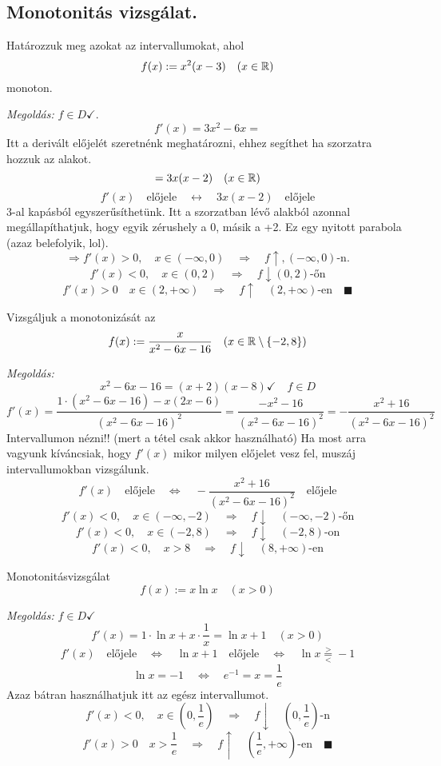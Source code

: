 \documentclass[a4paper,11.5pt]{article}
\begin{document}
	\subsection{Monotonitás vizsgálat.}
	\begin{task}Határozzuk meg azokat az intervallumokat, ahol
		 \[f(x):=x^2(x-3)\quad (x\in\mathbb{R})\]
		monoton.
		
		\textit{Megoldás:} $f\in D\checkmark$.
		\[ f'(x)=3x^2-6x= \]
		Itt a derivált előjelét szeretnénk meghatározni, ehhez segíthet ha szorzatra hozzuk az alakot.
		\[ =3x(x-2)\quad (x\in\mathbb{R}) \]
		\[ f'(x)\quad \text{előjele}\quad \leftrightarrow\quad 3x(x-2)\quad \text{előjele} \]
		3-al kapásból egyszerűsíthetünk. Itt a szorzatban lévő alakból azonnal megállapíthatjuk, hogy egyik zérushely a 0, másik a +2. Ez egy nyitott parabola (azaz belefolyik, lol).
		\[ \Rightarrow f'(x)>0,\quad x\in(-\infty,0)\quad \Rightarrow\quad f\uparrow, (-\infty, 0)\text{-n.} \]
		\[ f'(x)<0,\quad x\in(0,2)\quad \Rightarrow\quad f\downarrow (0,2)\text{-őn} \]
		\[ f'(x)>0\quad x\in (2,+\infty)\quad \Rightarrow\quad f\uparrow\quad (2,+\infty)\text{-en}\quad \blacksquare \]
	\end{task}
	\begin{task}
		Vizsgáljuk a monotonizását az
		\[ f(x):=\frac{x}{x^2-6x-16}\quad (x\in\mathbb{R}\setminus\{-2,8\}) \]
		
		\textit{Megoldás:}\[ x^2-6x-16=(x+2)(x-8)\checkmark\quad f\in D \]
		\[ f'(x)=\frac{1\cdot(x^2-6x-16)-x(2x-6)}{(x^2-6x-16)^2}=\frac{-x^2-16}{(x^2-6x-16)^2}=-\frac{x^2+16}{(x^2-6x-16)^2} \]
		Intervallumon nézni!! (mert a tétel csak akkor használható) Ha most arra vagyunk kíváncsiak, hogy $f'(x)$ mikor milyen előjelet vesz fel, muszáj intervallumokban vizsgálunk.
		\[ f'(x) \quad \text{előjele}\quad \Leftrightarrow\quad -\frac{x^2+16}{(x^2-6x-16)^2}\quad \text{előjele} \]
		\[ f'(x)<0, \quad x\in(-\infty,-2)\quad \Rightarrow\quad f\downarrow\quad (-\infty,-2)\text{-őn} \]
		\[ f'(x)<0, \quad x\in(-2,8)\quad \Rightarrow\quad f\downarrow\quad  (-2,8)\text{-on} \]
		\[ f'(x)<0, \quad x>8\quad \Rightarrow\quad f\downarrow\quad (8,+\infty)\text{-en} \]
	\end{task}
	\begin{task}
		Monotonitásvizsgálat
		\[ f(x):=x\ln x\quad (x>0) \]
		
		\textit{Megoldás:} $f\in D\checkmark$
		\[ f'(x)=1\cdot\ln x +x\cdot\frac{1}{x}=\ln x+1\quad (x>0) \]
		\[ f'(x) \quad \text{előjele}\quad \Leftrightarrow\quad \ln x+1\quad \text{előjele}\quad \Leftrightarrow\quad \ln x \overset{>}{\underset{<}{=}}-1 \]
		\[ \ln x = -1 \quad \Leftrightarrow \quad e^{-1}=x=\frac{1}{e} \]
		Azaz bátran használhatjuk itt az egész intervallumot.
		\[ f'(x)<0,\quad x\in\left(0,\frac{1}{e}\right)\quad \Rightarrow\quad f\downarrow\quad \left(0,\frac{1}{e}\right)\text{-n} \]
		\[ f'(x)>0 \quad x>\frac{1}{e}\quad \Rightarrow\quad f\uparrow\quad \left(\frac{1}{e},+\infty\right)\text{-en}\quad \blacksquare \]
	\end{task}
\end{document}
